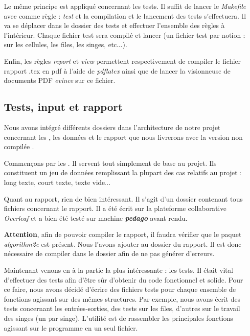 \documentclass{article}
\begin{document}
Le même principe est appliqué concernant les tests. Il suffit de lancer le \textit{Makefile} avec comme règle : \textit{test} et la compilation et le lancement des tests s'effectuera. Il va se déplacer dans le dossier des tests et effectuer l'ensemble des règles à l'intérieur. Chaque fichier test sera compilé et lancer (un fichier test par notion : sur les cellules, les files, les singes, etc...).

Enfin, les règles \textit{report} et \textit{view} permettent respectivement de compiler le fichier rapport .tex en pdf à l'aide de \textit{pdflatex} ainsi que de lancer la visionneuse de documents PDF \textit{evince} sur ce fichier.


\subsection{Tests, input et rapport}
\label{subsct;test_input}

Nous avons intégré différents dossiers dans l'architecture de notre projet concernant les , les données  et le rapport que nous livrerons avec la version non compilée .

Commençons par les . Il servent tout simplement de base au projet. Ils constituent un jeu de données remplissant la plupart des cas relatifs au projet : long texte, court texte, texte vide...

Quant au rapport, rien de bien intéressant. Il s'agit d'un dossier contenant tous fichiers concernant le rapport. Il a été écrit sur la plateforme collaborative \textit{Overleaf} et a bien été testé sur machine \textbf{\textit{pedago}} avant rendu.

 \textbf{Attention}, afin de pouvoir compiler le rapport, il faudra vérifier que le paquet \textit{algorithm2e} est présent. Nous l'avons ajouter au dossier du rapport. Il est donc nécessaire de compiler dans le dossier afin de ne pas générer d'erreurs.

Maintenant venons-en à la partie la plus intéressante : les tests. Il était vital d'effectuer des tests afin d'être sûr d'obtenir du code fonctionnel et solide. Pour ce faire, nous avons décidé d'écrire des fichiers tests pour chaque ensemble de fonctions agissant sur des mêmes structures. Par exemple, nous avons écrit des tests concernant les entrées-sorties, des tests sur les files, d'autres sur le travail des singes (un par singe). L'utilité est de rassembler les principales fonctions agissant sur le programme en un seul fichier.
\end{document}
